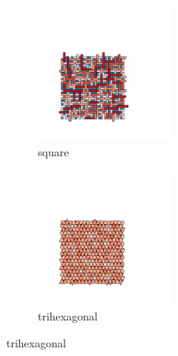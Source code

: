\begin{figure}[bt]
     \centering
     
     \begin{subfigure}[b]{0.45\textwidth}
         \centering
         \includegraphics[height=4.5cm]{./figures/procrystals/pro_sq3.pdf}
         \caption{square}
         \label{fig:pro3a}
     \end{subfigure}
      \begin{subfigure}[b]{0.45\textwidth}
         \centering
         \includegraphics[height=4.5cm]{./figures/procrystals/pro_trihex3.pdf}
         \caption{trihexagonal}
         \label{fig:pro3b}
     \end{subfigure}
     \hfill
     	

\end{figure}

